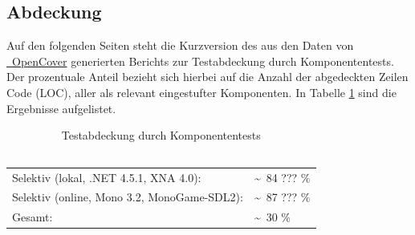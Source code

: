 %



\subsection{Abdeckung}
\label{Abschnitt:Tests:Statistik:Abdeckung}

\newcommand\VSLocalCoverage{\textasciitilde~84 ??? \%}

\newcommand\OnlineLocalCoverage{\textasciitilde~87 ??? \%}

\newcommand\VSGlobalCoverage{\textasciitilde~30 \%}

Auf den folgenden Seiten steht die Kurzversion des aus den Daten von \hyperref[Abschnitt:Tests:Werkzeuge:Automatisiert:OpenCover]{\mousecursor~OpenCover} generierten Berichts zur Testabdeckung durch Komponententests.
Der prozentuale Anteil bezieht sich hierbei auf die Anzahl der abgedeckten Zeilen Code (LOC), aller als relevant eingestufter Komponenten. In Tabelle \ref{Abschnitt:Tests:Statistik:Abdeckung:Tabelle} sind die Ergebnisse aufgelistet.

\begin{longtable}{p{0.5\hsize}p{0.5\hsize}}

	\caption{Testabdeckung durch Komponententests\\~\\}
	\label{Abschnitt:Tests:Statistik:Abdeckung:Tabelle}
	\\

	  Selektiv (lokal, .NET 4.5.1, XNA 4.0):
	& \VSLocalCoverage \\
	
	  Selektiv (online, Mono 3.2, MonoGame-SDL2):
	& \OnlineLocalCoverage \\
	
	  Gesamt:
	& \VSGlobalCoverage \\

\end{longtable}

~\\

